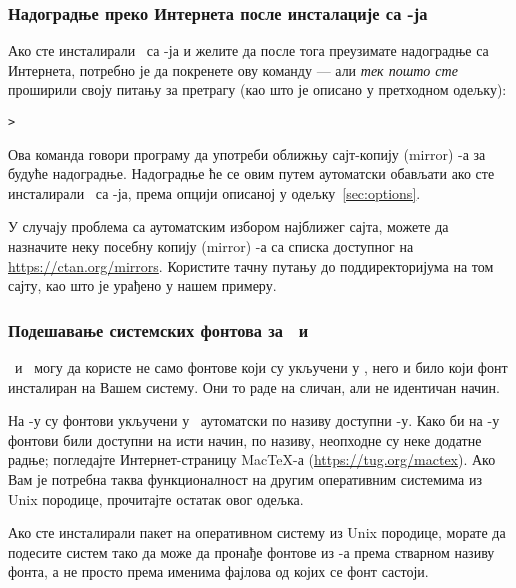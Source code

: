\documentclass{article}
\begin{document}
\subsubsection{Надоградње преко Интернета после инсталације са \DVD-ја}
\label{sec:dvd-install-net-updates}

Ако сте инсталирали \TL\ са \DVD-ја и желите да после тога преузимате
надоградње са Интернета, потребно је да покренете ову команду --- али
\emph{тек пошто сте} проширили своју питању за претрагу (као што је
описано у претходном одељку):

\begin{alltt}> 
\end{alltt}

Ова команда говори програму  да употреби оближњу
сајт-копију (\textenglish{mirror}) \CTAN-а за будуће надоградње.
Надоградње ће се овим путем аутоматски обављати ако сте инсталирали
\TL\ са \DVD-ја, према опцији описаној у одељку~\ref{sec:options}.


У случају проблема са аутоматским избором најближег сајта, можете да
назначите неку посебну копију (\textenglish{mirror}) \CTAN-а са списка
доступног на \url{https://ctan.org/mirrors}. Користите тачну путању до
поддиректоријума  на том сајту, као што је урађено у
нашем примеру.


\subsubsection{Подешавање системских фонтова за
  \protect\XeTeX\protect\ и \protect\LuaTeX}
\label{sec:font-conf-sys}

\XeTeX\ и \LuaTeX\ могу да користе не само фонтове који су укључени
у \TL, него и било који фонт инсталиран на Вашем систему. Они то раде
на сличан, али не идентичан начин.

На \Windows-у су фонтови укључени у \TL\ аутоматски по називу доступни
\XeTeX-у. Како би на \MacOSX-у фонтови били доступни на исти начин, по
називу, неопходне су неке додатне радње; погледајте Интернет-страницу
Mac\TeX-а (\url{https://tug.org/mactex}). Ако Вам је потребна таква
функционалност на другим оперативним системима из Unix породице,
прочитајте остатак овог одељка.

Ако сте инсталирали пакет  на оперативном систему
из Unix породице, морате да подесите систем тако да може да
пронађе фонтове из \TL-а према стварном називу фонта, а не просто
према именима фајлова од којих се фонт састоји.
\end{document}
